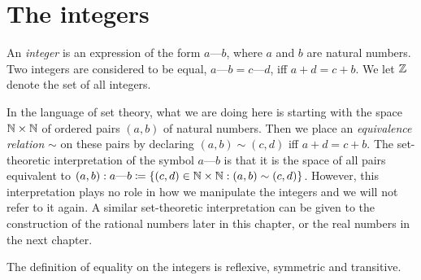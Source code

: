 \section{The integers}\label{sec:4.1}

\begin{defn}[Integers]\label{4.1.1}
  An \emph{integer} is an expression of the form \(a \text{---} b\), where \(a\) and \(b\) are natural numbers.
  Two integers are considered to be equal, \(a \text{---} b = c \text{---} d\), iff \(a + d = c + b\).
  We let \(\mathbb{Z}\) denote the set of all integers.
\end{defn}

\begin{note}
  In the language of set theory, what we are doing here is starting with the space \(\mathbb{N} \times \mathbb{N}\) of ordered pairs \((a, b)\) of natural numbers.
  Then we place an \emph{equivalence relation} \(\sim\) on these pairs by declaring \((a, b) \sim (c, d)\) iff \(a + d = c + b\).
  The set-theoretic interpretation of the symbol \(a \text{---} b\) is that it is the space of all pairs equivalent to \((a, b): a \text{---} b \coloneqq \left\lbrace(c, d) \in \mathbb{N} \times \mathbb{N} : (a, b) \sim (c, d)\right\rbrace\).
  However, this interpretation plays no role in how we manipulate the integers and we will not refer to it again.
  A similar set-theoretic interpretation can be given to the construction of the rational numbers later in this chapter, or the real numbers in the next chapter.
\end{note}

\begin{ac}\label{ac:4.1.1}
  The definition of equality on the integers is reflexive, symmetric and transitive.
\end{ac}

